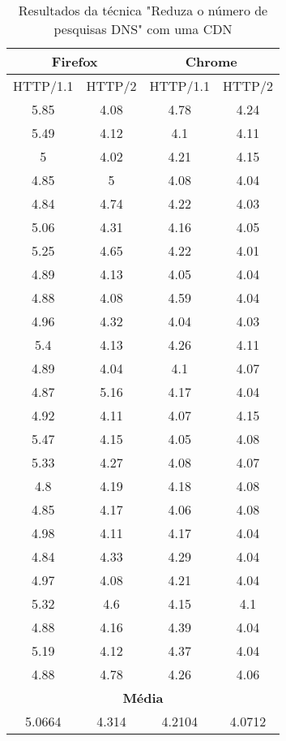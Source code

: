 \begin{table}[h]
	\centering
	\caption{Resultados da técnica "Reduza o número de pesquisas DNS" com uma CDN}
	\label{resultados-reduzaonumerodepesquisasdns-unica}
	\begin{tabular}{cccc}
		\hline
		\multicolumn{2}{c}{\textbf{Firefox}} & \multicolumn{2}{c}{\textbf{Chrome}} \\
		\hline
		HTTP/1.1 & HTTP/2 & HTTP/1.1 & HTTP/2 \\
		\hline
		5.85 & 4.08 & 4.78 & 4.24 \\
		5.49 & 4.12 & 4.1  & 4.11 \\
		5    & 4.02 & 4.21 & 4.15 \\
		4.85 & 5  & 4.08 & 4.04 \\
		4.84 & 4.74 & 4.22 & 4.03 \\
		5.06 & 4.31 & 4.16 & 4.05 \\
		5.25 & 4.65 & 4.22 & 4.01 \\
		4.89 & 4.13 & 4.05 & 4.04 \\
		4.88 & 4.08 & 4.59 & 4.04 \\
		4.96 & 4.32 & 4.04 & 4.03 \\
		5.4  & 4.13 & 4.26 & 4.11 \\
		4.89 & 4.04 & 4.1  & 4.07 \\
		4.87 & 5.16 & 4.17 & 4.04 \\
		4.92 & 4.11 & 4.07 & 4.15 \\
		5.47 & 4.15 & 4.05 & 4.08 \\
		5.33 & 4.27 & 4.08 & 4.07 \\
		4.8  & 4.19 & 4.18 & 4.08 \\
		4.85 & 4.17 & 4.06 & 4.08 \\
		4.98 & 4.11 & 4.17 & 4.04 \\
		4.84 & 4.33 & 4.29 & 4.04 \\
		4.97 & 4.08 & 4.21 & 4.04 \\
		5.32 & 4.6  & 4.15 & 4.1  \\
		4.88 & 4.16 & 4.39 & 4.04 \\
		5.19 & 4.12 & 4.37 & 4.04 \\
		4.88 & 4.78 & 4.26 & 4.06 \\
		\hline
		\multicolumn{4}{c}{\textbf{Média}} \\
		5.0664 & 4.314 & 4.2104 & 4.0712 \\
		\hline
	\end{tabular}
\end{table}